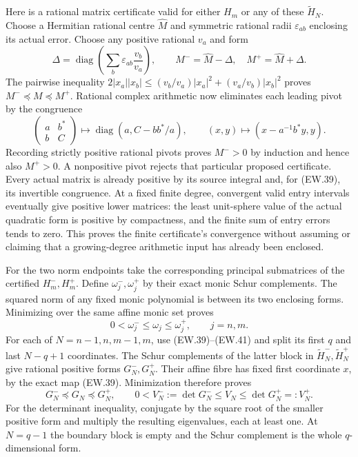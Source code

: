 \documentclass[11pt]{article}
\newcommand{\diag}{\operatorname{diag}}
\begin{document}
Here is a rational matrix certificate valid for either $H_m$ or
any of these $\widetilde H_N$. Choose a Hermitian rational centre
$\widehat M$ and symmetric rational radii $\varepsilon_{ab}$
enclosing its actual error. Choose any positive rational $v_a$ and
form
\[
 \Delta=\diag\left(\sum_b\varepsilon_{ab}\frac{v_b}{v_a}\right),
 \qquad M^-=\widehat M-\Delta,\quad M^+=\widehat M+\Delta.
                                                               \tag{EW.40}
\]
The pairwise inequality
$2|x_a||x_b|\le(v_b/v_a)|x_a|^2+(v_a/v_b)|x_b|^2$
proves $M^-\preceq M\preceq M^+$. Rational complex arithmetic
now eliminates each leading pivot by the congruence
\[
 \begin{pmatrix}a&b^*\\b&C\end{pmatrix}
 \longmapsto\diag(a,C-bb^*/a),\qquad
 (x,y)\longmapsto(x-a^{-1}b^*y,y).                           \tag{EW.41}
\]
Recording strictly positive rational pivots proves $M^->0$ by
induction and hence also $M^+>0$. A nonpositive pivot rejects that
particular proposed certificate. Every actual matrix is already
positive by its source integral and, for (EW.39), its invertible
congruence. At a fixed finite degree, convergent valid entry intervals
eventually give positive lower matrices: the least unit-sphere value
of the actual quadratic form is positive by compactness, and the
finite sum of entry errors tends to zero. This proves the finite
certificate's convergence without assuming or claiming that a
growing-degree arithmetic input has already been enclosed.

For the two norm endpoints take the corresponding principal
submatrices of the certified $H_m^-,H_m^+$. Define
$\omega_j^-,\omega_j^+$ by their exact monic Schur complements.
The squared norm of any fixed monic polynomial is between its two
enclosing forms. Minimizing over the same affine monic set proves
\[
 0<\omega_j^-\le\omega_j\le\omega_j^+,
 \qquad j=n,m.                                               \tag{EW.42}
\]
For each of $N=n-1,n,m-1,m$, use (EW.39)--(EW.41) and split
its first $q$ and last $N-q+1$ coordinates. The Schur complements
of the latter block in $\widetilde H_N^-,\widetilde H_N^+$
give rational positive forms $G_N^-,G_N^+$. Their affine fibre
has fixed first coordinate $x$, by the exact map (EW.39).
Minimization therefore proves
\[
 G_N^-\preceq G_N\preceq G_N^+,\qquad
 0<V_N^-:=\det G_N^-\le V_N\le\det G_N^+=:V_N^+.
                                                               \tag{EW.43}
\]
For the determinant inequality, conjugate by the square root of
the smaller positive form and multiply the resulting eigenvalues,
each at least one. At $N=q-1$ the boundary block is empty and
the Schur complement is the whole $q$-dimensional form.
\end{document}

